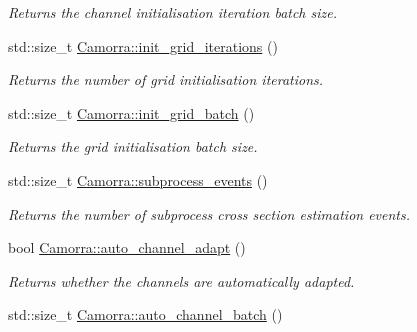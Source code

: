 \begin{DoxyCompactItemize}
\begin{DoxyCompactList}\small\item\em Returns the channel initialisation iteration batch size. \end{DoxyCompactList}\item 
\hypertarget{a00800_a7099f4be7379b50523119d1ecbe1e48e}{
std::size\_\-t \hyperlink{a00800_a7099f4be7379b50523119d1ecbe1e48e}{Camorra::init\_\-grid\_\-iterations} ()}
\label{a00800_a7099f4be7379b50523119d1ecbe1e48e}

\begin{DoxyCompactList}\small\item\em Returns the number of grid initialisation iterations. \end{DoxyCompactList}\item 
\hypertarget{a00800_a488455fe84957f9249d705f5914da34a}{
std::size\_\-t \hyperlink{a00800_a488455fe84957f9249d705f5914da34a}{Camorra::init\_\-grid\_\-batch} ()}
\label{a00800_a488455fe84957f9249d705f5914da34a}

\begin{DoxyCompactList}\small\item\em Returns the grid initialisation batch size. \end{DoxyCompactList}\item 
\hypertarget{a00800_ac4c5254a693a8917059b098648f56ccd}{
std::size\_\-t \hyperlink{a00800_ac4c5254a693a8917059b098648f56ccd}{Camorra::subprocess\_\-events} ()}
\label{a00800_ac4c5254a693a8917059b098648f56ccd}

\begin{DoxyCompactList}\small\item\em Returns the number of subprocess cross section estimation events. \end{DoxyCompactList}\item 
\hypertarget{a00800_a9f20e2a090436db910851c6b4b37bed4}{
bool \hyperlink{a00800_a9f20e2a090436db910851c6b4b37bed4}{Camorra::auto\_\-channel\_\-adapt} ()}
\label{a00800_a9f20e2a090436db910851c6b4b37bed4}

\begin{DoxyCompactList}\small\item\em Returns whether the channels are automatically adapted. \end{DoxyCompactList}\item 
\hypertarget{a00800_a1d0ec0f5dcd474956fb1e545c277329f}{
std::size\_\-t \hyperlink{a00800_a1d0ec0f5dcd474956fb1e545c277329f}{Camorra::auto\_\-channel\_\-batch} ()}
\label{a00800_a1d0ec0f5dcd474956fb1e545c277329f}


\end{DoxyCompactItemize}
